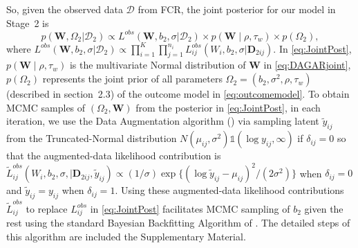 \documentclass[aoas]{imsart}
\theoremstyle{plain}
\theoremstyle{definition}
\begin{document}
So, given the observed data $\mathcal{D}$ from FCR, the joint posterior for our model in Stage~2 is 
\begin{equation}
    p(\mathbf{W}, \Omega_2\vert \mathcal{D}_2) \propto L^{obs}(\mathbf{W}, b_2, \sigma \vert \mathcal{D}_2 )\times p(\mathbf{W} \mid \rho, \tau_w) \times p(\Omega_2),
    \label{eq:JointPost}
\end{equation}
where $L^{obs}(\mathbf{W}, b_2, \sigma \vert \mathcal{D}_2 )\propto \prod_{i=1}^K \prod_{j=1}^{n_i} L_{ij}^{obs}(W_i, b_2, \sigma\vert \mathbf{D}_{2ij})$. In \eqref{eq:JointPost}, $p(\mathbf{W} \mid \rho, \tau_w)$ is the multivariate Normal distribution of $\mathbf{W}$ in \eqref{eq:DAGARjoint}, $p(\Omega_2)$ represents the joint prior of all  parameters $\Omega_2=( b_2, \sigma^2,\rho,\tau_w)$ (described in section~2.3) of the outcome model in \eqref{eq:outcomemodel}.  
To obtain MCMC samples of $(\Omega_2,\mathbf{W})$ from the posterior in \eqref{eq:JointPost}, in each iteration, 
we use the Data Augmentation algorithm  (\parencite{Tanner1987TheAugmentation}) via sampling latent  $\tilde{y}_{ij}$ from the Truncated-Normal distribution $N(\mu_{ij}, \sigma^2)\mathds{1}(\log y_{ij}, \infty)$ if $\delta_{ij} = 0$ so that the  augmented-data likelihood contribution is
 $\tilde{L}^{obs}_{ij}(W_i, b_2, \sigma,  \vert \mathbf{D}_{2ij},\tilde{y}_{ij})\propto (1/\sigma)\exp\{(\log \tilde{y}_{ij}-\mu_{ij})^2/(2\sigma^2)\}$ when $\delta_{ij}=0$ and $\tilde{y}_{ij}=y_{ij}$ when $\delta_{ij}=1$. Using these augmented-data likelihood contributions $\tilde{L}^{obs}_{ij}$ to replace ${L}^{obs}_{ij}$ in  \eqref{eq:JointPost} facilitates MCMC sampling of  $b_2$ given the rest using the standard Bayesian Backfitting Algorithm of \parencite{Chipman10, Trevor2000backfitting}.
The detailed steps of this algorithm are included the Supplementary Material. 


 

\end{document}
